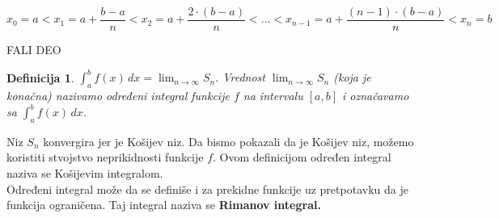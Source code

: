\documentclass[11pt]{article}
\newcounter{mathitem}
\theoremstyle{plain}
\newtheorem{definicija}[mathitem]{Definicija}
\theoremstyle{serbnodot}
\begin{document}
\begin{center}
\end{center}
\[ x_0 = a < x_1 = a + \frac{b-a}{n} < x_2 = a + \frac{2 \cdot (b-a)}{n} < \dots < x_{n-1} = a + \frac{(n-1) \cdot (b - a)}{n} < x_n = b\]


FALI DEO

\begin{definicija}
  \(\int_{a}^{b} f(x) \, dx = \lim_{n \to \infty} S_n. \) Vrednost \(\lim_{n \to \infty} S_n\) (koja je konačna) nazivamo \emph{određeni integral} funkcije \( f \) na intervalu \([a,b]\) i označavamo sa \(\int_{a}^{b} f(x) \, dx\).
\end{definicija}

Niz \( S_n \) konvergira jer je Košijev niz. Da bismo pokazali da je Košijev niz, možemo koristiti stvojstvo neprikidnosti funkcije \( f \).
Ovom definicijom određen integral naziva se Košijevim integralom. \\
Određeni integral može da se definiše i za prekidne funkcije uz pretpotavku da je funkcija ograničena. Taj integral naziva se \textbf{Rimanov integral.} 
\end{document}
